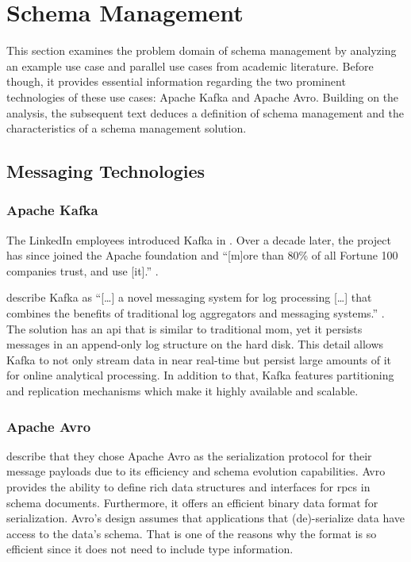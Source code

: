
\section{Schema Management}\label{sec:schema-management}

This section examines the problem domain of schema management by analyzing an example use case and parallel use cases from academic literature.
Before though, it provides essential information regarding the two prominent technologies of these use cases: Apache Kafka and Apache Avro.
Building on the analysis, the subsequent text deduces a definition of schema management and the characteristics of a schema management solution.

\subsection{Messaging Technologies}

\subsubsection{Apache Kafka}

The LinkedIn employees \citeauthor{kreps_kafka_2011} introduced Kafka in \citeyear{kreps_kafka_2011}.
Over a decade later, the project has since joined the Apache foundation and \enquote{[m]ore than 80\% of all Fortune 100 companies trust, and use [it].} \parencite{noauthor_apache_nodate}.

\citeauthor{kreps_kafka_2011} describe Kafka as \enquote{[\ldots] a novel messaging system for log processing [\ldots] that combines the benefits of traditional log aggregators and messaging systems.} \parencite{kreps_kafka_2011}.
The solution has an \gls{api} that is similar to traditional \gls{mom}, yet it persists messages in an append-only log structure on the hard disk.
This detail allows Kafka to not only stream data in near real-time but persist large amounts of it for online analytical processing.
In addition to that, Kafka features partitioning and replication mechanisms which make it highly available and scalable. \parencite{kreps_kafka_2011}

\subsubsection{Apache Avro}

\citeauthor{kreps_kafka_2011} describe that they chose Apache Avro as the serialization protocol for their message payloads due to its efficiency and schema evolution capabilities. 
Avro provides the ability to define rich data structures and interfaces for \glspl{rpc} in schema documents.
Furthermore, it offers an efficient binary data format for serialization.
Avro's design assumes that applications that (de)-serialize data have access to the data's schema.
That is one of the reasons why the format is so efficient since it does not need to include type information.


